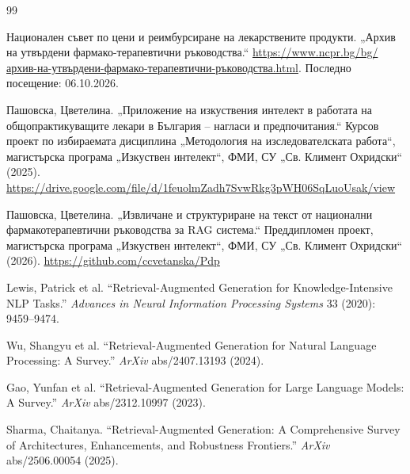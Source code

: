\documentclass[12pt,a4paper]{article}
\begin{document}
{\small
\begin{thebibliography}{99}
\raggedright

Национален съвет по цени и реимбурсиране на лекарствените продукти.
„Архив на утвърдени фармако-терапевтични ръководства.“
\href{https://www.ncpr.bg/bg/%D0%B0%D1%80%D1%85%D0%B8%D0%B2-%D0%BD%D0%B0-%D1%83%D1%82%D0%B2%D1%8A%D1%80%D0%B4%D0%B5%D0%BD%D0%B8-%D1%84%D0%B0%D1%80%D0%BC%D0%B0%D0%BA%D0%BE-%D1%82%D0%B5%D1%80%D0%B0%D0%BF%D0%B5%D0%B2%D1%82%D0%B8%D1%87%D0%BD%D0%B8-%D1%80%D1%8A%D0%BA%D0%BE%D0%B2%D0%BE%D0%B4%D1%81%D1%82%D0%B2%D0%B0.html}{https://www.ncpr.bg/bg/архив-на-утвърдени-фармако-терапевтични-ръководства.html}.
Последно посещение: 06.10.2026.

Пашовска, Цветелина.
„Приложение на изкуствения интелект в работата на общопрактикуващите лекари в България -- нагласи и предпочитания.“
Курсов проект по избираемата дисциплина „Методология на изследователската работа“, магистърска програма „Изкуствен интелект“, ФМИ, СУ „Св. Климент Охридски“ (2025).
\url{https://drive.google.com/file/d/1feuolmZadh7SvwRkg3pWH06SqLuoUsak/view}

Пашовска, Цветелина.
„Извличане и структуриране на текст от национални фармакотерапевтични ръководства за RAG система.“
Преддипломен проект, магистърска програма „Изкуствен интелект“, ФМИ, СУ „Св. Климент Охридски“ (2026).
\url{https://github.com/ccvetanska/Pdp}

Lewis, Patrick et al.
“Retrieval-Augmented Generation for Knowledge-Intensive NLP Tasks.”
\emph{Advances in Neural Information Processing Systems} 33 (2020): 9459--9474.

Wu, Shangyu et al.
“Retrieval-Augmented Generation for Natural Language Processing: A Survey.”
\emph{ArXiv} abs/2407.13193 (2024).

Gao, Yunfan et al.
“Retrieval-Augmented Generation for Large Language Models: A Survey.”
\emph{ArXiv} abs/2312.10997 (2023).

Sharma, Chaitanya.
“Retrieval-Augmented Generation: A Comprehensive Survey of Architectures, Enhancements, and Robustness Frontiers.”
\emph{ArXiv} abs/2506.00054 (2025).


\end{thebibliography}}
\end{document}
